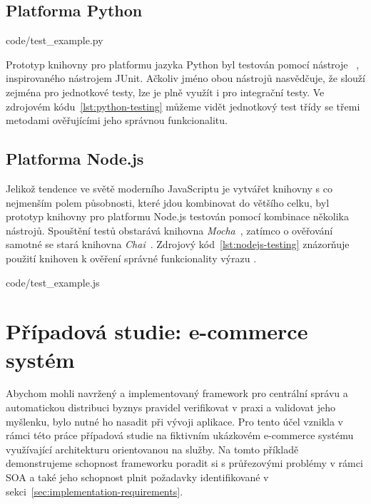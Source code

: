 \subsection{Platforma Python}


{code/test_example.py}

Prototyp knihovny pro platformu jazyka Python byl testován pomocí
nástroje ~\cite{pythonunittest}, inspirovaného nástrojem
JUnit. Ačkoliv jméno obou nástrojů nasvědčuje, že slouží zejména pro jednotkové testy,
lze je plně využít i pro integrační testy. Ve zdrojovém kódu~\ref{lst:python-testing} můžeme
vidět jednotkový test třídy  se třemi metodami ověřujícími jeho
správnou funkcionalitu.


\subsection{Platforma Node.js}

Jelikož tendence ve světě moderního JavaScriptu je vytvářet knihovny s co nejmenším polem působnosti,
které jdou kombinovat do většího celku, byl prototyp knihovny pro platformu Node.js testován pomocí
kombinace několika nástrojů. Spouštění testů obstarává knihovna \textit{Mocha}~\cite{mocha}, zatímco
o ověřování samotné se stará knihovna \textit{Chai}~\cite{chai}. Zdrojový kód~\ref{lst:nodejs-testing}
znázorňuje použití knihoven k ověření správné funkcionality výrazu .



{code/test_example.js}

\section{Případová studie: e-commerce systém}

Abychom mohli navržený a implementovaný framework pro centrální správu
a automatickou distribuci byznys pravidel verifikovat v praxi a validovat
jeho myšlenku, bylo nutné ho nasadit při vývoji aplikace.
Pro tento účel vznikla v rámci této práce případová studie na fiktivním
ukázkovém e-commerce systému využívající architekturu orientovanou na služby.
Na tomto příkladě demonstrujeme schopnost frameworku poradit si s průřezovými
problémy v rámci \gls{SOA} a také jeho schopnost plnit požadavky identifikované v
sekci~\ref{sec:implementation-requirements}.

